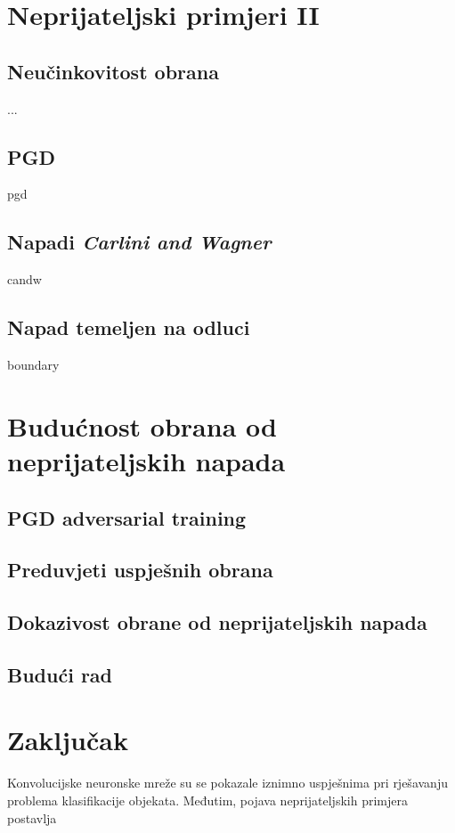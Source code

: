 \documentclass[utf8, diplomski]{fer}
\begin{document}
\chapter{Neprijateljski primjeri II}
\section{Neučinkovitost obrana} ...
\section{PGD} pgd\citep{Madry2017TowardsDL}
\section{Napadi \textit{Carlini and Wagner}} candw\citep{Carlini2017TowardsET}
\section{Napad temeljen na odluci} boundary\citep{Brendel2017DecisionBasedAA}

\chapter{Budućnost obrana od neprijateljskih napada}
\section{PGD adversarial training}
\section{Preduvjeti uspješnih obrana}
\section{Dokazivost obrane od neprijateljskih napada}
\section{Budući rad}

\chapter{Zaključak}
Konvolucijske neuronske mreže su se pokazale iznimno uspješnima pri rješavanju problema klasifikacije objekata. Međutim, pojava neprijateljskih primjera postavlja 




\end{document}
